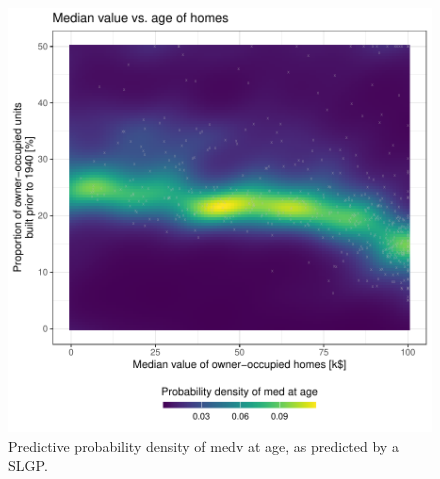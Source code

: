 \documentclass[
]{article}
\begin{document}
\begin{figure}[H]

{\centering \includegraphics{IntroductionSLGP_files/figure-latex/SLGPplotting1-1} 

}

\caption{Predictive probability density of medv at age, as predicted by a SLGP.}\label{fig:SLGPplotting1}
\end{figure}
\end{document}
